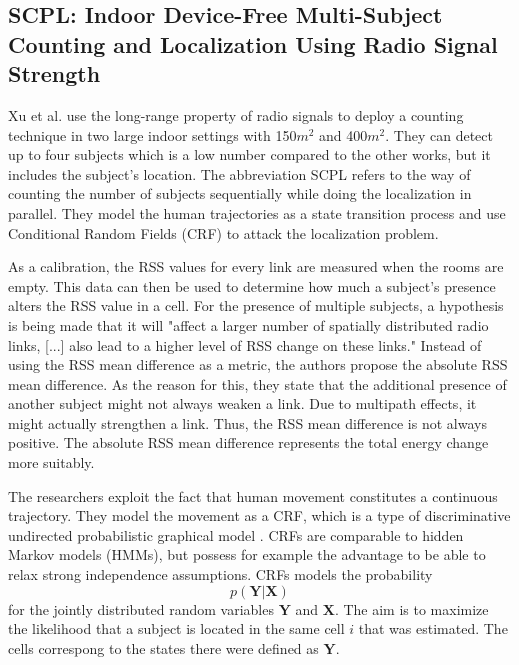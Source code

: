 \documentclass[conference]{IEEEtran}
\begin{document}
\subsection{SCPL: Indoor Device-Free Multi-Subject Counting and Localization Using Radio Signal Strength}
Xu et al. \cite{Xu} use the long-range property of radio signals to deploy a counting technique in two large indoor settings with 150$m^2$ and 400$m^2$. They can detect up to four subjects which is a low number compared to the other works, but it includes the subject's location. The abbreviation SCPL refers to the way of counting the number of subjects sequentially while doing the localization in parallel. They model the human trajectories as a state transition process and use Conditional Random Fields (CRF) to attack the localization problem.
\par
As a calibration, the RSS values for every link are measured when the rooms are empty. This data can then be used to determine how much a subject's presence alters the RSS value in a cell. For the presence of multiple subjects, a hypothesis is being made that it will "affect a larger number of spatially distributed radio links, [...] also lead to a higher level of RSS change on these links." Instead of using the RSS mean difference as a metric, the authors propose the absolute RSS mean difference. As the reason for this, they state that the additional presence of another subject might not always weaken a link. Due to multipath effects, it might actually strengthen a link. Thus, the RSS mean difference is not always positive. The absolute RSS mean difference represents the total energy change more suitably.
\par
The researchers exploit the fact that human movement constitutes a continuous trajectory. They model the movement as a CRF, which is a type of discriminative undirected probabilistic graphical model \cite{crf}. CRFs are comparable to hidden Markov models (HMMs), but possess for example the advantage to be able to relax strong independence assumptions. CRFs models the probability $$p(\bm{Y}|\bm{X})$$ for the jointly distributed random variables $\bm{Y}$ and $\bm{X}$. The aim is to maximize the likelihood that a subject is located in the same cell $i$ that was estimated. The cells correspong to the states there were defined as $\bm{Y}$.
\end{document}
